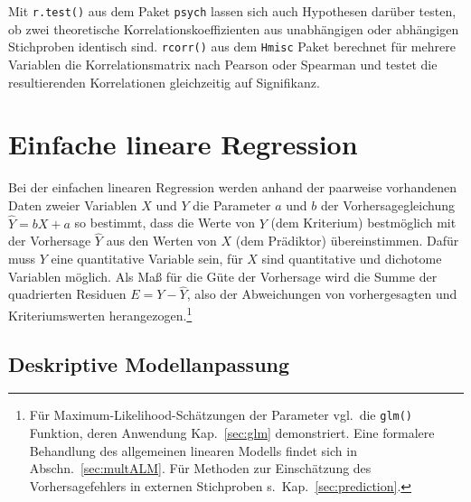 Mit \lstinline!r.test()! aus dem Paket \lstinline!psych! lassen sich auch Hypothesen darüber testen, ob zwei theoretische Korrelationskoeffizienten aus unabhängigen oder abhängigen Stichproben identisch sind. \lstinline!rcorr()! aus dem \lstinline!Hmisc! \cite{HarrellJr2008a} Paket berechnet für mehrere Variablen die Korrelationsmatrix nach Pearson oder Spearman und testet die resultierenden Korrelationen gleichzeitig auf Signifikanz.

\section{Einfache lineare Regression}
\label{sec:regrSimple}

Bei der einfachen linearen Regression werden anhand der paarweise vorhandenen Daten zweier Variablen $X$ und $Y$ die Parameter $a$ und $b$ der Vorhersagegleichung $\hat{Y} = b X + a$ so bestimmt, dass die Werte von $Y$ (dem Kriterium) bestmöglich mit der Vorhersage $\hat{Y}$ aus den Werten von $X$ (dem Prädiktor) übereinstimmen. Dafür muss $Y$ eine quantitative Variable sein, für $X$ sind quantitative und dichotome Variablen möglich. Als Maß für die Güte der Vorhersage wird die Summe der quadrierten Residuen $E = Y - \hat{Y}$, also der Abweichungen von vorhergesagten und Kriteriumswerten herangezogen.\footnote{Für Maximum-Likelihood-Schätzungen der Parameter vgl.\ die \lstinline!glm()! Funktion, deren Anwendung Kap.\ \ref{sec:glm} demonstriert. Eine formalere Behandlung des allgemeinen linearen Modells findet sich in Abschn.\ \ref{sec:multALM}. Für Methoden zur Einschätzung des Vorhersagefehlers in externen Stichproben s.\ Kap.\ \ref{sec:prediction}.}

\subsection{Deskriptive Modellanpassung}
\label{sec:regrSimpleDescr}

